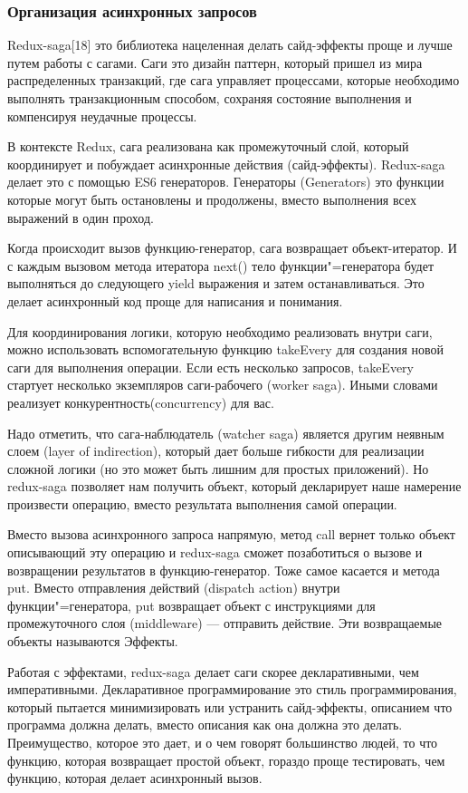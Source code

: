 \subsubsection{Организация асинхронных запросов}\hfill

Redux-saga[18] это библиотека нацеленная делать сайд-эффекты проще и лучше путем работы с сагами.
Саги это дизайн паттерн, который пришел из мира распределенных транзакций, где сага управляет процессами, которые необходимо выполнять транзакционным способом, сохраняя состояние выполнения и компенсируя неудачные процессы.

В контексте Redux, сага реализована как промежуточный слой, который координирует и побуждает асинхронные действия (сайд-эффекты).
Redux-saga делает это с помощью ES6 генераторов.
Генераторы (Generators) это функции которые могут быть остановлены и продолжены, вместо выполнения всех выражений в один проход.

Когда происходит вызов функцию-генератор, сага возвращает объект-итератор.
И с каждым вызовом метода итератора next() тело функции"=генератора будет выполняться до следующего yield выражения и затем останавливаться.
Это делает асинхронный код проще для написания и понимания.

Для координирования логики, которую необходимо реализовать внутри саги, можно использовать вспомогательную функцию takeEvery для создания новой саги для выполнения операции.
Если есть несколько запросов, takeEvery стартует несколько экземпляров саги-рабочего (worker saga).
Иными словами реализует конкурентность(concurrency) для вас.

Надо отметить, что сага-наблюдатель (watcher saga) является другим неявным слоем (layer of indirection), который дает больше гибкости для реализации сложной логики (но это может быть лишним для простых приложений).
Но redux-saga позволяет нам получить объект, который декларирует наше намерение произвести операцию, вместо результата выполнения самой операции.

Вместо вызова асинхронного запроса напрямую, метод call вернет только объект описывающий эту операцию и redux-saga сможет позаботиться о вызове и возвращении результатов в функцию-генератор.
Тоже самое касается и метода put.
Вместо отправления действий (dispatch action) внутри функции"=генератора, put возвращает объект с инструкциями для промежуточного слоя (middleware) — отправить действие.
Эти возвращаемые объекты называются Эффекты.

Работая с эффектами, redux-saga делает саги скорее декларативными, чем императивными.
Декларативное программирование это стиль программирования, который пытается минимизировать или устранить сайд-эффекты, описанием что программа должна делать, вместо описания как она должна это делать.
Преимущество, которое это дает, и о чем говорят большинство людей, то что функцию, которая возвращает простой объект, гораздо проще тестировать, чем функцию, которая делает асинхронный вызов.
